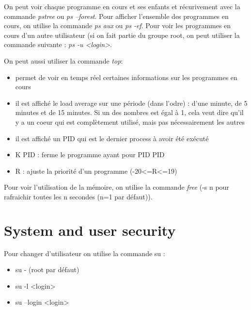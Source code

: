 \documentclass{article}
\begin{document}
\noindent On peut voir chaque programme en cours et ses enfants et récurivement avec la commande \textit{pstree} ou \textit{ps --forest}. Pour afficher l'ensemble des programmes en cours, on utilise la commande \textit{ps aux} ou \textit{ps -ef}. Pour voir les programmes en cours d'un autre utilisateur (si on fait partie du groupe root, on peut utiliser la commande suivante : \textit{ps -u <login>}.\newline

On peut aussi utiliser la commande \textit{top}:
\begin{itemize}
    \item permet de voir en temps réel certaines informations sur les programmes en cours
    \item il est affiché le load average sur une période (dans l'odre) : d'une minute, de 5 minutes et de 15 minutes. Si un des nombres est égal à 1, cela veut dire qu'il y a un coeur qui est complètement utilisé, mais pas nécessairement les autres
    \item il est affiché un PID qui est le dernier process à avoir été exécuté
    \item K PID : ferme le programme ayant pour PID PID
    \item R : ajuste la priorité d'un programme (-20<=R<=19)
\end{itemize}

\noindent Pour voir l'utilisation de la mémoire, on utilise la commande \textit{free} (-s n pour rafraichir toutes les n secondes (n=1 par défaut)).\newline

\newpage
\section{System and user security}
Pour changer d'utilisateur on utilise la commande su : 
\begin{itemize}
    \item su -  (root par défaut)
    \item su -l <login>
    \item su --login <login>
\end{itemize}
\end{document}
